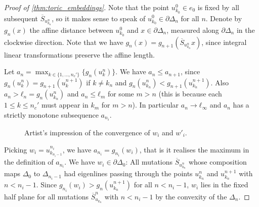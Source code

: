 \documentclass[12pt,a4paper,draft]{scrartcl}
\begin{document}
\begin{proof}[Proof of \cref{thm:toric_embeddings}]
  Note that the point $u_{k_0}^0 ∈ e_0$ is fixed by all subsequent $\overline{S}_{u_{k_n}^n}$, so it makes sense to speak of $u_{k_0}^0 ∈ ∂Δ_n$ for all $n$.
  Denote by $g_n(x)$ the affine distance between $u_{k_0}^0$ and $x ∈ ∂Δ_n$, measured along $∂Δ_n$ in the clockwise direction.
  Note that we have $g_n(x) = g_{n+1}(\overline{S}_{u_{k_n}^n}x)$, since integral linear transformations preserve the affine length.

  Let $a_n = \max_{k ∈\{1,…,n_c'\}} \{g_n(u_k^n)\}$.
  We have $a_n ≤ a_{n+1}$, since $g_n(u_k^n) = g_{n+1}(u_k^{n+1})$ if $k ≠ k_n$ and $g_n(u_{k_n}^n) < g_{n+1}(u_{k_n}^{n+1})$.
Also $a_n > ℓ_n = g_n(u_{k_n}^n)$ and $a_n ≤ ℓ_m$ for some $m>n$ (this is because each $1 ≤ k ≤ n_c'$ must appear in $k_{m}$ for $m>n$).
  In particular $a_n → ℓ_∞$ and $a_n$ has a strictly monotone subsequence $a_{n_i}$.

  \begin{figure}
    \centering
    \caption{Artist's impression of the convergence of $w_i$ and $w'_i$.}
    \label{fig:stretch_wi}
  \end{figure}
  
  Picking $w_i = u_{k_{n_i -1}}^{n_i}$, we have $a_{n_i} = g_{n_i}(w_i)$, that is it realises the maximum in the definition of $a_{n_i}$.
  We have $w_i ∈ ∂Δ_0$: All mutations $\overline{S}_{u_{k_n}^n}$ whose composition maps $Δ_0$ to $Δ_{n_i-1}$ had eigenlines passing through the points $u_{k_n}^n$ and $u_{k_n}^{n+1}$ with $n<n_i-1$.
Since $g_{n_i}(w_i) > g_n(u_{k_n}^{n+1})$ for all $n<n_i-1$, $w_i$ lies in the fixed half plane  for all mutations $\overline{S}_{u_{k_n}}^n$ with $n< n_i-1$ by the convexity of the $Δ_n$.


\end{proof}
\end{document}
